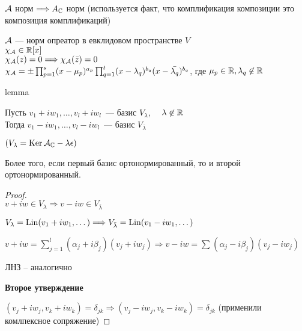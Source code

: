 \follow $\mathcal{A} $ норм $ \Longrightarrow A_{\mathbb{C}} $ норм (используется факт, что комплификация композиции это композиция комплификаций)


\begin{theorem}
    $ \mathcal{A} $ --- норм опреатор в евклидовом пространстве $ V $ \\
    $ \chi_{\mathcal{A}} \in \mathbb{R}[x] $ \\
    $ \chi_{\mathcal{A}}(z) = 0 \Longrightarrow \chi_{\mathcal{A}}(\bar{z}) = 0 $ \\
    $ \chi_{\mathcal{A}} = \pm \prod_{p = 1}^{s} (x - \mu_p)^{a_p} \prod_{q = 1}^{t} (x - \lambda_q)^{b_q} (x - \bar{\lambda_q})^{b_q}$, где $\mu_p \in \mathbb{R} , \lambda_q \not \in \mathbb{R}$ \\
\end{theorem}

lemma

Пусть $v_1 + iw_1, \dots, v_l + iw_l$~--- базис $V_{\lambda}$, $\quad \lambda \not \in \mathbb{R}$ \\
Тогда $v_1 - iw_1, \dots, v_l - iw_l$~--- базис $V_{\bar{\lambda}}$

$ (V_{\lambda} = \operatorname{Ker}{\mathcal{A}_{\mathbb{C}} - \lambda \epsilon}) $ %

Более того, если первый базис ортонормированный, то и второй ортонормированный.

\begin{proof}
$ $ \\
$v + iw \in V_{\lambda} \Longrightarrow v - iw \in V_{\bar{\lambda}}$ %

$ V_{\lambda} = \operatorname{Lin}(v_1 + iw_1, \dots ) \Longrightarrow V_{\bar{\lambda}} = \operatorname{Lin}(v_1 - iw_1, \dots) $

$ v + iw = \sum_{j = 1}^{l} (\alpha_j + i \beta_j) (v_j + i w_j) \Longrightarrow v - iw = \sum_{}^{} (\alpha_j - i \beta_j) (v_j - i w_j) $

ЛНЗ -- аналогично


\textbf{Второе утверждение} 

$ (v_j + i w_j, v_k + iw_k) = \delta_{jk} \Longrightarrow  (v_j - i w_j, v_k - iw_k) = \delta_{jk}$ (применили комлпексное сопряжение)
\end{proof}

